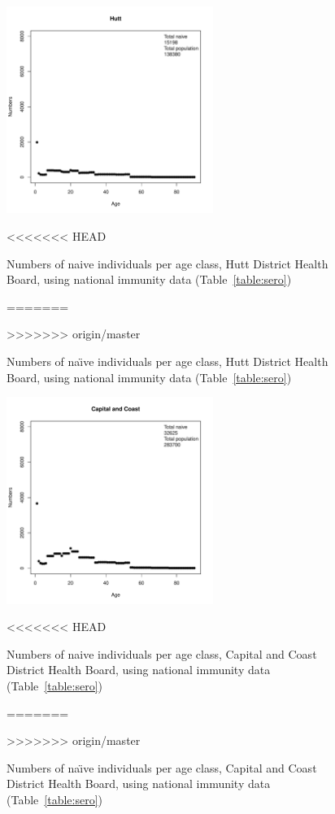 \documentclass{article}
\begin{document}
\begin{itemize}
\begin{figure}[H]
     \begin{center}
     \includegraphics[width=0.6\textwidth]{dhb13.pdf}
     \end{center}
<<<<<<< HEAD
     \caption{Numbers of naive individuals per age class, Hutt District Health Board, using national immunity data (Table~\ref{table:sero})}
=======
     \caption{Numbers of na\"{\i}ve individuals per age class, Hutt District Health Board, using national immunity data (Table~\ref{table:sero})}
>>>>>>> origin/master
     \label{fig:Hutt}
\end{figure}

\begin{figure}[H]
     \begin{center}
     \includegraphics[width=0.6\textwidth]{dhb14.pdf}
     \end{center}
<<<<<<< HEAD
     \caption{Numbers of naive individuals per age class, Capital and Coast District Health Board, using national immunity data (Table~\ref{table:sero})}
=======
     \caption{Numbers of na\"{\i}ve individuals per age class, Capital and Coast District Health Board, using national immunity data (Table~\ref{table:sero})}
>>>>>>> origin/master
     \label{fig:CapitalandCoast}
\end{figure}


\end{itemize}
\end{document}
